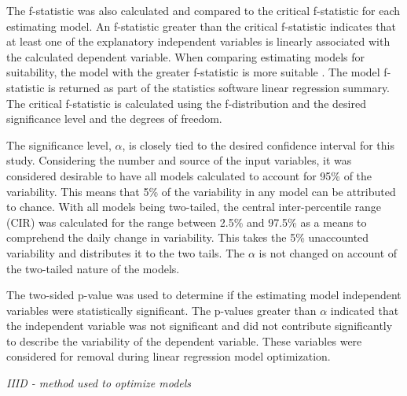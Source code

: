 \begin{linenumbers}
The f-statistic was also calculated and compared to the critical f-statistic for each estimating model. An f-statistic greater than the critical f-statistic indicates that at least one of the explanatory independent variables is linearly associated with the calculated dependent variable.  When comparing estimating models for suitability, the model with the greater f-statistic is more suitable \citep{Johnson2007}.  The model f-statistic is returned as part of the statistics software linear regression summary.  The critical f-statistic is calculated using the f-distribution and the desired significance level and the degrees of freedom.

The significance level, $\alpha$, is closely tied to the desired confidence interval for this study.  Considering the number and source of the input variables, it was considered desirable to have all models calculated to account for 95\% of the variability.  This means that 5\% of the variability in any model can be attributed to chance.  With all models being two-tailed, the central inter-percentile range (CIR) was calculated for the range between 2.5\% and 97.5\% as a means to comprehend the daily change in variability.  This takes the 5\% unaccounted variability and distributes it to the two tails.  The $\alpha$ is not changed on account of the two-tailed nature of the models.

The two-sided p-value was used to determine if the estimating model independent variables were statistically significant.  The p-values greater than $\alpha$ indicated that the independent variable was not significant and did not contribute significantly to describe the variability of the dependent variable.  These variables were considered for removal during linear regression model optimization.

\emph{IIID - method used to optimize models}\\


\end{linenumbers}

